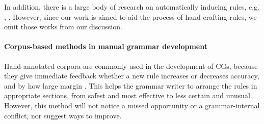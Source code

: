 In addition, there is a large body of research on automatically inducing rules, e.g. \cite{inducing_cg1996}, \cite{lindberg_eineborg98ilp}
. However, since our work is aimed to aid the process of hand-crafting rules, we omit those works from our discussion.


\paragraph{Corpus-based methods in manual grammar development}

Hand-annotated corpora are commonly used in the development of CGs, because they give immediate feedback whether a new rule increases or decreases accuracy, and by how large margin \cite{voutilainen2004}.
This helps the grammar writer to arrange the rules in appropriate sections, from safest and most effective to less certain and unusual. 
However, this method will not notice a missed opportunity or a grammar-internal conflict, nor suggest ways to improve.








